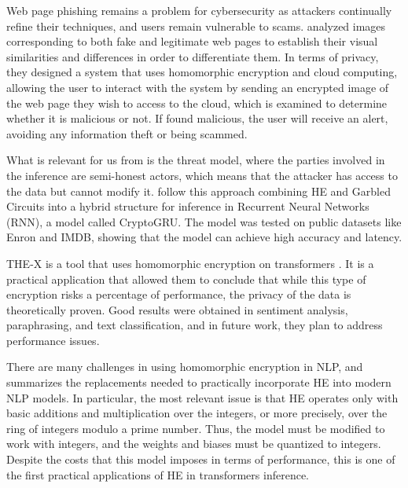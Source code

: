 \documentclass[11pt]{article}
\begin{document}
Web page phishing remains a problem for cybersecurity as attackers continually refine their techniques, and users remain vulnerable to scams. \cite{Chou2020} analyzed images corresponding to both fake and legitimate web pages to establish their visual similarities and differences in order to differentiate them. In terms of privacy, they designed a system that uses homomorphic encryption and cloud computing, allowing the user to interact with the system by sending an encrypted image of the web page they wish to access to the cloud, which is examined to determine whether it is malicious or not. If found malicious, the user will receive an alert, avoiding any information theft or being scammed.

What is relevant for us from \cite{Chou2020} is the threat model, where the parties involved in the inference are semi-honest actors, which means that the attacker has access to the data but cannot modify it. \cite{Cryptogru_2021} follow this approach combining HE and Garbled Circuits into a hybrid structure for inference in Recurrent Neural Networks (RNN), a model called CryptoGRU. The model was tested on public datasets like Enron and IMDB, showing that the model can achieve high accuracy and latency.

THE-X is a tool that uses homomorphic encryption on transformers \cite{Chen2022}. It is a practical application that allowed them to conclude that while this type of encryption risks a percentage of performance, the privacy of the data is theoretically proven. Good results were obtained in sentiment analysis, paraphrasing, and text classification, and in future work, they plan to address performance issues.

There are many challenges in using homomorphic encryption in NLP, and \cite{Chen2022} summarizes the replacements needed to practically incorporate HE into modern NLP models. In particular, the most relevant issue is that HE operates only with basic additions and multiplication over the integers, or more precisely, over the ring of integers modulo a prime number. Thus, the model must be modified to work with integers, and the weights and biases must be quantized to integers. Despite the costs that this model imposes in terms of performance, this is one of the first practical applications of HE in transformers inference.




\end{document}
